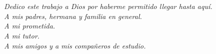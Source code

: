 \section*{}
\pagestyle{empty}
\vfill
    \begin{flushright}
        \textit{
        Dedico este trabajo a Dios por haberme permitido llegar hasta aquí.\\
        A mis padres, hermana y familia en general.\\
        A mi prometida.\\
        A mi tutor.\\
        A mis amigos y a mis compañeros de estudio.
    }\end{flushright}